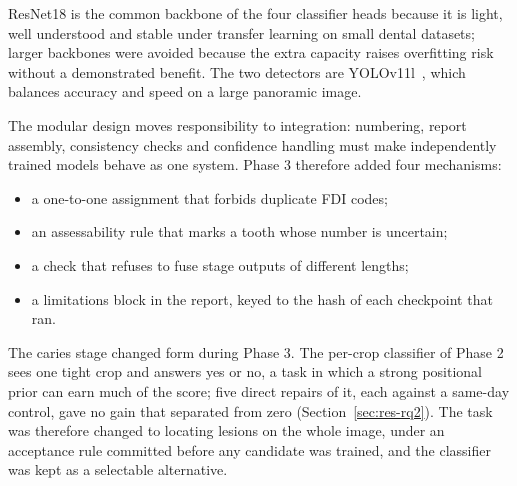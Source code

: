 ResNet18 is the common backbone of the four classifier heads because it is light, well understood
and stable under transfer learning on small dental datasets; larger backbones were avoided because
the extra capacity raises overfitting risk without a demonstrated benefit. The two detectors are
YOLOv11l~\cite{jocher2024yolo11}, which balances accuracy and speed on a large panoramic image.

The modular design moves responsibility to integration: numbering, report assembly, consistency
checks and confidence handling must make independently trained models behave as one system. Phase 3
therefore added four mechanisms:
\begin{itemize}
\item a one-to-one assignment that forbids duplicate FDI codes;
\item an assessability rule that marks a tooth whose number is uncertain;
\item a check that refuses to fuse stage outputs of different lengths;
\item a limitations block in the report, keyed to the hash of each checkpoint that ran.
\end{itemize}

The caries stage changed form during Phase 3. The per-crop classifier of Phase 2 sees one tight crop
and answers yes or no, a task in which a strong positional prior can earn much of the score; five
direct repairs of it, each against a same-day control, gave no gain that separated from zero
(Section~\ref{sec:res-rq2}). The task was therefore changed to locating lesions on the whole image,
under an acceptance rule committed before any candidate was trained, and the classifier was kept as
a selectable alternative. %
